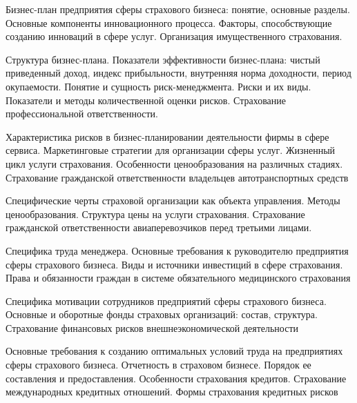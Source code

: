 \documentclass[
	11pt,
	a4paper,
	]
	{article}
\begin{document}
\bigskip

\noindent{} 
	{
		Бизнес-план предприятия сферы страхового бизнеса: понятие, основные разделы.
	}{
		Основные компоненты инновационного процесса. Факторы, способствующие созданию инноваций в сфере услуг.
	}{
		Организация имущественного страхования.
	}

\bigskip

\noindent{} 
	{
		Структура бизнес-плана. Показатели эффективности бизнес-плана: чистый приведенный доход, индекс прибыльности, внутренняя норма доходности, период окупаемости.
	}{
		Понятие и сущность риск-менеджмента. Риски и их виды. Показатели и методы количественной оценки рисков.
	}{
		Страхование профессиональной ответственности.
	}

\bigskip

\noindent{} 
	{
		Характеристика рисков в бизнес-планировании деятельности фирмы в сфере сервиса.
	}{
		Маркетинговые стратегии для организации сферы услуг. Жизненный цикл услуги страхования. Особенности ценообразования на различных стадиях.
	}{
		Страхование гражданской ответственности владельцев автотранспортных средств
	}

\bigskip

\noindent{} 
	{
		Специфические черты страховой организации как объекта управления.
	}{
		Методы ценообразования. Структура цены на услуги страхования.
	}{
		Страхование гражданской ответственности авиаперевозчиков перед третьими лицами.
	}

\bigskip

\noindent{} 
	{
		Специфика труда менеджера. Основные требования к руководителю предприятия сферы страхового бизнеса.
	}{
		Виды и источники инвестиций в сфере страхования.
	}{
		Права и обязанности граждан в системе обязательного медицинского страхования
	}

\bigskip

\noindent{} 
	{
		Специфика мотивации сотрудников предприятий сферы страхового бизнеса.
	}{
		Основные и оборотные фонды страховых организаций: состав, структура.
	}{
		Страхование финансовых рисков внешнеэкономической деятельности
	}

\bigskip

\noindent{} 
	{
		Основные требования к созданию оптимальных условий труда на предприятиях сферы страхового бизнеса.
	}{
		Отчетность в страховом бизнесе. Порядок ее составления и предоставления.
	}{
		Особенности страхования кредитов. Страхование международных кредитных отношений. Формы страхования кредитных рисков
	}
\end{document}
